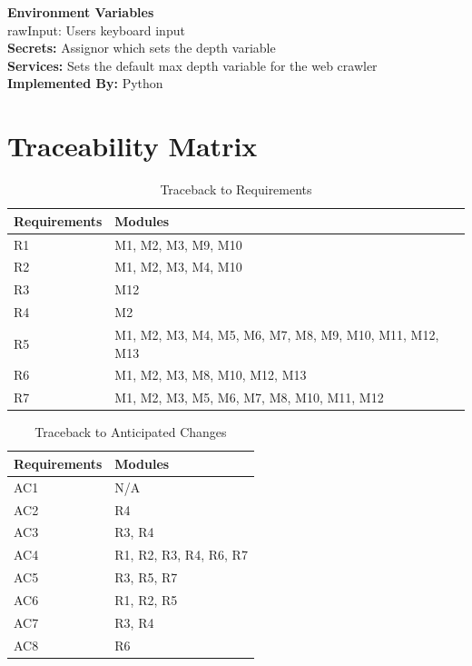 \documentclass[titlepage]{article}
\begin{document}
\textbf{Environment Variables}\\
rawInput: Users keyboard input\\

\textbf{Secrets:}
Assignor which sets the depth variable\\

\textbf{Services:}
Sets the default max depth variable for the web crawler\\

\textbf{Implemented By:}
Python

\section{Traceability Matrix}
\begin{table}[h!]
\centering
    \begin{tabular}{| p{5cm} | p{5cm} |}    \hline
    Requirements &Modules\\ \hline
    
      R1  &M1, M2, M3, M9, M10 \\ \hline
      R2  &M1, M2, M3, M4, M10 \\ \hline
      R3  &M12 \\ \hline
      R4  &M2 \\ \hline
      R5  &M1, M2, M3, M4, M5, M6, M7, M8, M9, M10, M11, M12, M13 \\ \hline
      R6  &M1, M2, M3, M8, M10, M12, M13 \\ \hline
      R7  &M1, M2, M3, M5, M6, M7, M8, M10, M11, M12 \\ \hline
      
    \end{tabular}
    \caption{Traceback to Requirements}
\label{table:Traceback to Requirements}
\end{table}

\begin{table}[h!]
\centering
    \begin{tabular}{| p{5cm} | p{5cm} |}    \hline
    Requirements &Modules\\ \hline
    
      AC1  & N/A\\ \hline
      AC2  & R4\\ \hline
      AC3  & R3, R4\\ \hline
      AC4  & R1, R2, R3, R4, R6, R7\\ \hline
      AC5  & R3, R5, R7\\ \hline
      AC6  & R1, R2, R5\\ \hline
      AC7  & R3, R4\\ \hline
      AC8  & R6\\ \hline
      
    \end{tabular}
    \caption{Traceback to Anticipated Changes}
\label{table:Traceback to Anticipated Changes}
\end{table}
\end{document}
